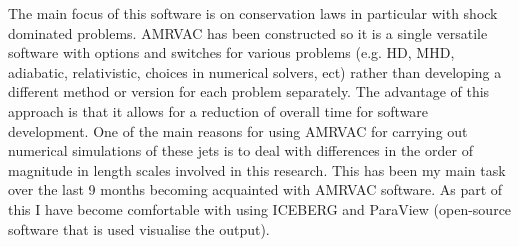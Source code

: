 \documentclass[12pt,a4paper,twoside]{article}
\begin{document}
The main focus of this software is on conservation laws in particular with shock dominated problems. AMRVAC has been constructed so it is a single versatile software with options and switches for various problems (e.g. HD, MHD, adiabatic, relativistic, choices in numerical solvers, ect) rather than developing a different method or version for each problem separately. The advantage of this approach is that it allows for a reduction of overall time for software development. One of the main reasons for using AMRVAC for carrying out numerical simulations of these jets is to deal with differences in the order of magnitude in length scales involved in this research. This has been my main task over the last 9 months becoming acquainted with AMRVAC software. As part of this I have become comfortable with using ICEBERG and ParaView (open-source software that is used visualise the output).
\end{document}

